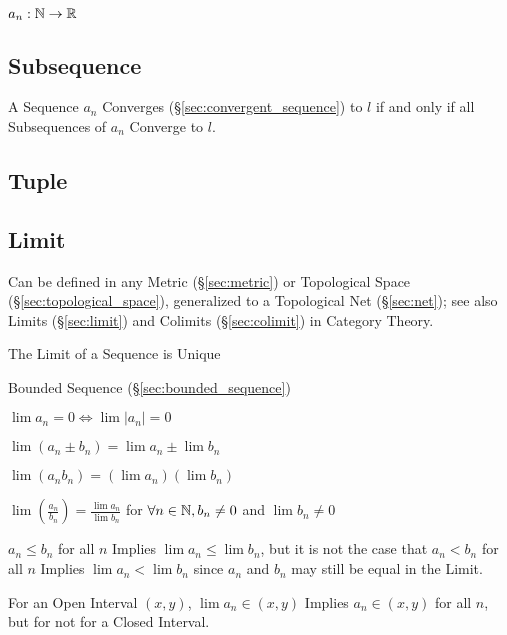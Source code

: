 $a_n : \mathbb{N} \rightarrow \mathbb{R}$



\subsection{Subsequence}\label{sec:subsequence}

A Sequence $a_n$ Converges (\S\ref{sec:convergent_sequence}) to $l$
if and only if all Subsequences of $a_n$ Converge to $l$.



\subsection{Tuple}\label{sec:tuple}

\subsection{Limit}\label{sec:sequence_limit}

Can be defined in any Metric (\S\ref{sec:metric}) or Topological Space
(\S\ref{sec:topological_space}), generalized to a Topological Net
(\S\ref{sec:net}); see also Limits (\S\ref{sec:limit}) and Colimits
(\S\ref{sec:colimit}) in Category Theory.

The Limit of a Sequence is Unique

Bounded Sequence (\S\ref{sec:bounded_sequence})

$\lim a_n = 0 \Leftrightarrow \lim |a_n| = 0$

$\lim (a_n \pm b_n) = \lim a_n \pm \lim b_n$

$\lim (a_n b_n) = (\lim a_n) (\lim b_n)$

$\lim (\frac{a_n}{b_n}) = \frac{\lim a_n}{\lim b_n}$ for $\forall
n \in \mathbb{N}, b_n \neq 0$ and $\lim b_n \neq 0$

$a_n \leq b_n$ for all $n$ Implies $\lim a_n \leq \lim b_n$, but it is
not the case that $a_n < b_n$ for all $n$ Implies $\lim a_n < \lim
b_n$ since $a_n$ and $b_n$ may still be equal in the Limit.

For an Open Interval $(x,y)$, $\lim a_n \in (x,y)$ Implies $a_n \in
(x,y)$ for all $n$, but for not for a Closed Interval.



